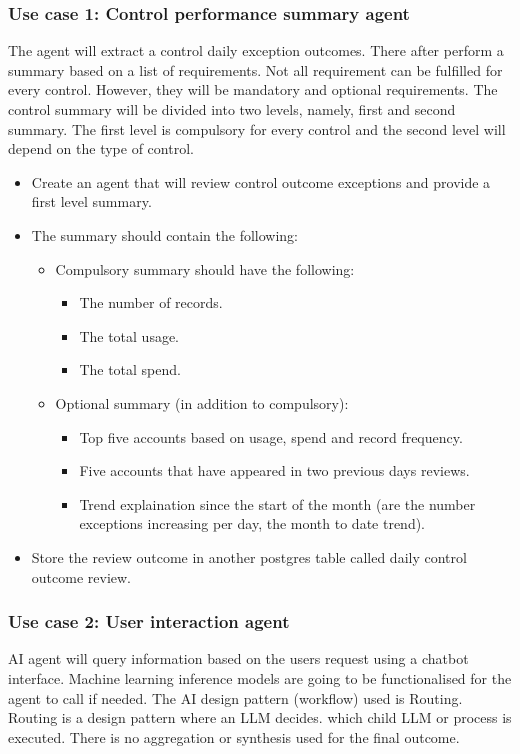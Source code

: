 \documentclass{article}
\begin{document}
\subsubsection{Use case 1: Control performance summary agent}
The agent will extract a control daily exception outcomes. There after perform a summary based on a list of requirements. Not all requirement can
be fulfilled for every control. However, they will be mandatory and optional requirements. The control summary will be divided into two levels, namely,
first and second summary. The first level is compulsory for every control and the second level will depend on the type of control.  
\begin{itemize}
    \item Create an agent that will review control outcome exceptions and provide a first level summary.
    \item The summary should contain the following:
    \begin{itemize}
        \item Compulsory summary should have the following: 
        \begin{itemize}
            \item The number of records.
            \item The total usage.
            \item The total spend. 
        \end{itemize}
        \item Optional summary (in addition to compulsory):
        \begin{itemize}
            \item Top five accounts based on usage, spend and record frequency.
            \item Five accounts that have appeared in two previous days reviews.
            \item Trend explaination since the start of the month (are the number exceptions increasing per day, the month to date trend).
        \end{itemize}
    \end{itemize}
    \item Store the review outcome in another postgres table called daily control outcome review.
\end{itemize}

\subsubsection{Use case 2: User interaction agent}
AI agent will query information based on the users request using a chatbot interface. Machine learning inference models are 
going to be functionalised for the agent to call if needed. The AI design pattern (workflow) used is Routing. Routing is a design pattern 
where an LLM decides. which child LLM or process is executed. There is no aggregation or synthesis used for the final outcome.
\end{document}
